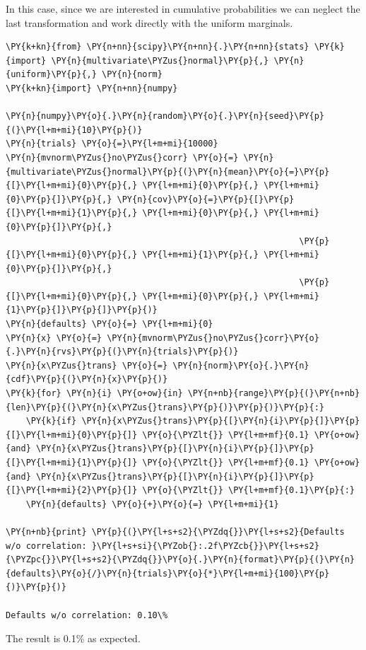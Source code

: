 In this case, since we are interested in cumulative probabilities we can neglect the last transformation and work directly with the 
uniform marginals.

\begin{tcolorbox}[breakable, size=fbox, boxrule=1pt, pad at break*=1mm,colback=cellbackground, colframe=cellborder]
\begin{Verbatim}[commandchars=\\\{\}]
\PY{k+kn}{from} \PY{n+nn}{scipy}\PY{n+nn}{.}\PY{n+nn}{stats} \PY{k}{import} \PY{n}{multivariate\PYZus{}normal}\PY{p}{,} \PY{n}{uniform}\PY{p}{,} \PY{n}{norm}
\PY{k+kn}{import} \PY{n+nn}{numpy}
	
\PY{n}{numpy}\PY{o}{.}\PY{n}{random}\PY{o}{.}\PY{n}{seed}\PY{p}{(}\PY{l+m+mi}{10}\PY{p}{)}
\PY{n}{trials} \PY{o}{=}\PY{l+m+mi}{10000}
\PY{n}{mvnorm\PYZus{}no\PYZus{}corr} \PY{o}{=} \PY{n}{multivariate\PYZus{}normal}\PY{p}{(}\PY{n}{mean}\PY{o}{=}\PY{p}{[}\PY{l+m+mi}{0}\PY{p}{,} \PY{l+m+mi}{0}\PY{p}{,} \PY{l+m+mi}{0}\PY{p}{]}\PY{p}{,} \PY{n}{cov}\PY{o}{=}\PY{p}{[}\PY{p}{[}\PY{l+m+mi}{1}\PY{p}{,} \PY{l+m+mi}{0}\PY{p}{,} \PY{l+m+mi}{0}\PY{p}{]}\PY{p}{,}
                                                          \PY{p}{[}\PY{l+m+mi}{0}\PY{p}{,} \PY{l+m+mi}{1}\PY{p}{,} \PY{l+m+mi}{0}\PY{p}{]}\PY{p}{,}
                                                          \PY{p}{[}\PY{l+m+mi}{0}\PY{p}{,} \PY{l+m+mi}{0}\PY{p}{,} \PY{l+m+mi}{1}\PY{p}{]}\PY{p}{]}\PY{p}{)}
\PY{n}{defaults} \PY{o}{=} \PY{l+m+mi}{0}
\PY{n}{x} \PY{o}{=} \PY{n}{mvnorm\PYZus{}no\PYZus{}corr}\PY{o}{.}\PY{n}{rvs}\PY{p}{(}\PY{n}{trials}\PY{p}{)}
\PY{n}{x\PYZus{}trans} \PY{o}{=} \PY{n}{norm}\PY{o}{.}\PY{n}{cdf}\PY{p}{(}\PY{n}{x}\PY{p}{)}
\PY{k}{for} \PY{n}{i} \PY{o+ow}{in} \PY{n+nb}{range}\PY{p}{(}\PY{n+nb}{len}\PY{p}{(}\PY{n}{x\PYZus{}trans}\PY{p}{)}\PY{p}{)}\PY{p}{:}
    \PY{k}{if} \PY{n}{x\PYZus{}trans}\PY{p}{[}\PY{n}{i}\PY{p}{]}\PY{p}{[}\PY{l+m+mi}{0}\PY{p}{]} \PY{o}{\PYZlt{}} \PY{l+m+mf}{0.1} \PY{o+ow}{and} \PY{n}{x\PYZus{}trans}\PY{p}{[}\PY{n}{i}\PY{p}{]}\PY{p}{[}\PY{l+m+mi}{1}\PY{p}{]} \PY{o}{\PYZlt{}} \PY{l+m+mf}{0.1} \PY{o+ow}{and} \PY{n}{x\PYZus{}trans}\PY{p}{[}\PY{n}{i}\PY{p}{]}\PY{p}{[}\PY{l+m+mi}{2}\PY{p}{]} \PY{o}{\PYZlt{}} \PY{l+m+mf}{0.1}\PY{p}{:}
	\PY{n}{defaults} \PY{o}{+}\PY{o}{=} \PY{l+m+mi}{1}
	
\PY{n+nb}{print} \PY{p}{(}\PY{l+s+s2}{\PYZdq{}}\PY{l+s+s2}{Defaults w/o correlation: }\PY{l+s+si}{\PYZob{}:.2f\PYZcb{}}\PY{l+s+s2}{\PYZpc{}}\PY{l+s+s2}{\PYZdq{}}\PY{o}{.}\PY{n}{format}\PY{p}{(}\PY{n}{defaults}\PY{o}{/}\PY{n}{trials}\PY{o}{*}\PY{l+m+mi}{100}\PY{p}{)}\PY{p}{)}

Defaults w/o correlation: 0.10\%
\end{Verbatim}
\end{tcolorbox}
The result is 0.1\% as expected.

